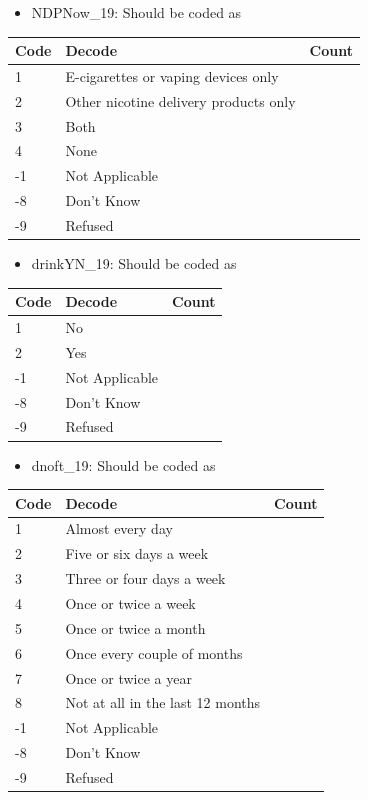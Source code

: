 \documentclass[
  11pt,
]{article}
\providecommand{\tightlist}{%
  \setlength{\itemsep}{0pt}\setlength{\parskip}{0pt}}
\begin{document}
\begin{itemize}
\tightlist
\item
  NDPNow\_19: Should be coded as
\end{itemize}

\begin{longtable}[]{@{}lll@{}}
\toprule()
Code & Decode & Count \\
\midrule()
\endhead
1 & E-cigarettes or vaping devices only & \\
2 & Other nicotine delivery products only & \\
3 & Both & \\
4 & None & \\
-1 & Not Applicable & \\
-8 & Don't Know & \\
-9 & Refused & \\
\bottomrule()
\end{longtable}

\begin{itemize}
\tightlist
\item
  drinkYN\_19: Should be coded as
\end{itemize}

\begin{longtable}[]{@{}lll@{}}
\toprule()
Code & Decode & Count \\
\midrule()
\endhead
1 & No & \\
2 & Yes & \\
-1 & Not Applicable & \\
-8 & Don't Know & \\
-9 & Refused & \\
\bottomrule()
\end{longtable}

\begin{itemize}
\tightlist
\item
  dnoft\_19: Should be coded as
\end{itemize}

\begin{longtable}[]{@{}lll@{}}
\toprule()
Code & Decode & Count \\
\midrule()
\endhead
1 & Almost every day & \\
2 & Five or six days a week & \\
3 & Three or four days a week & \\
4 & Once or twice a week & \\
5 & Once or twice a month & \\
6 & Once every couple of months & \\
7 & Once or twice a year & \\
8 & Not at all in the last 12 months & \\
-1 & Not Applicable & \\
-8 & Don't Know & \\
-9 & Refused & \\
\bottomrule()
\end{longtable}
\end{document}
